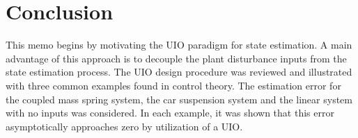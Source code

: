\documentclass{amsart}
\theoremstyle{definition}
\theoremstyle{remark}
\numberwithin{equation}{section}
\begin{document}
\section{Conclusion}
This memo begins by motivating the UIO paradigm for state estimation.  A main advantage of this approach is to decouple the plant disturbance inputs from the state estimation process.  The UIO design procedure was reviewed and illustrated with three common examples found in control theory.  The estimation error for the coupled mass spring system, the car suspension system and the linear system with no inputs was considered. In each example, it was shown that this error asymptotically approaches zero by utilization of a UIO.
\end{document}
